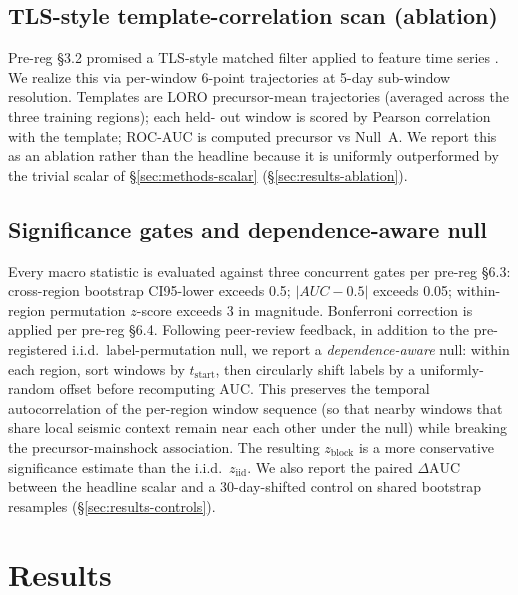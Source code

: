 \documentclass[11pt]{article}
\begin{document}
\subsection{TLS-style template-correlation scan (ablation)}
\label{sec:methods-tls}

Pre-reg \S 3.2 promised a TLS-style matched filter applied to feature
time series \citep[cf. matrix-profile-based seismic template matching;]
[]{senobari2024}. We realize this via per-window 6-point trajectories
at 5-day sub-window resolution. Templates are LORO precursor-mean
trajectories (averaged across the three training regions); each held-
out window is scored by Pearson correlation with the template; ROC-AUC
is computed precursor vs Null~A. We report this as an ablation rather
than the headline because it is uniformly outperformed by the trivial
scalar of \S\ref{sec:methods-scalar} (\S\ref{sec:results-ablation}).

\subsection{Significance gates and dependence-aware null}
\label{sec:methods-gates}

Every macro statistic is evaluated against three concurrent gates per
pre-reg \S 6.3: cross-region bootstrap CI95-lower exceeds 0.5;
$|AUC - 0.5|$ exceeds 0.05; within-region permutation $z$-score
exceeds 3 in magnitude. Bonferroni correction is applied per pre-reg
\S 6.4. Following peer-review feedback, in addition to the
pre-registered i.i.d.\ label-permutation null, we report a
\emph{dependence-aware} null: within each region, sort windows by
$t_\mathrm{start}$, then circularly shift labels by a uniformly-random
offset before recomputing AUC. This preserves the temporal
autocorrelation of the per-region window sequence (so that nearby
windows that share local seismic context remain near each other under
the null) while breaking the precursor-mainshock association. The
resulting $z_\mathrm{block}$ is a more conservative significance
estimate than the i.i.d.\ $z_\mathrm{iid}$. We also report the paired
$\Delta\mathrm{AUC}$ between the headline scalar and a 30-day-shifted
control on shared bootstrap resamples
(\S\ref{sec:results-controls}).

\section{Results}
\label{sec:results}
\end{document}
